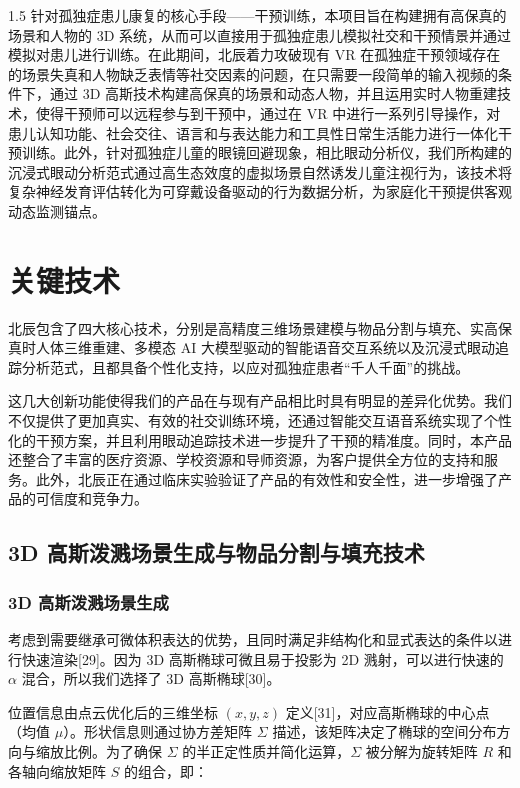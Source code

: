 \documentclass[zihao=-4]{ctexart}
\begin{document}
\begin{spacing}{1.5}
针对孤独症患儿康复的核心手段——干预训练，本项目旨在构建拥有高保真的场景和人物的 3D 系统，从而可以直接用于孤独症患儿模拟社交和干预情景并通过模拟对患儿进行训练。在此期间，北辰着力攻破现有 VR 在孤独症干预领域存在的场景失真和人物缺乏表情等社交因素的问题，在只需要一段简单的输入视频的条件下，通过 3D 高斯技术构建高保真的场景和动态人物，并且运用实时人物重建技术，使得干预师可以远程参与到干预中，通过在 VR 中进行一系列引导操作，对患儿认知功能、社会交往、语言和与表达能力和工具性日常生活能力进行一体化干预训练。此外，针对孤独症儿童的眼镜回避现象，相比眼动分析仪，我们所构建的沉浸式眼动分析范式通过高生态效度的虚拟场景自然诱发儿童注视行为，该技术将复杂神经发育评估转化为可穿戴设备驱动的行为数据分析，为家庭化干预提供客观动态监测锚点。

\section{关键技术}

北辰包含了四大核心技术，分别是高精度三维场景建模与物品分割与填充、实高保真时人体三维重建、多模态 AI 大模型驱动的智能语音交互系统以及沉浸式眼动追踪分析范式，且都具备个性化支持，以应对孤独症患者“千人千面”的挑战。

这几大创新功能使得我们的产品在与现有产品相比时具有明显的差异化优势。我们不仅提供了更加真实、有效的社交训练环境，还通过智能交互语音系统实现了个性化的干预方案，并且利用眼动追踪技术进一步提升了干预的精准度。同时，本产品还整合了丰富的医疗资源、学校资源和导师资源，为客户提供全方位的支持和服务。此外，北辰正在通过临床实验验证了产品的有效性和安全性，进一步增强了产品的可信度和竞争力。

\subsection{3D 高斯泼溅场景生成与物品分割与填充技术}

\subsubsection{3D 高斯泼溅场景生成}

考虑到需要继承可微体积表达的优势，且同时满足非结构化和显式表达的条件以进行快速渲染[29]。因为 3D 高斯椭球可微且易于投影为 2D 溅射，可以进行快速的 $\alpha$ 混合，所以我们选择了 3D 高斯椭球[30]。

位置信息由点云优化后的三维坐标 $(x,y,z)$ 定义[31]，对应高斯椭球的中心点（均值 $\mu$）。形状信息则通过协方差矩阵 $\Sigma$ 描述，该矩阵决定了椭球的空间分布方向与缩放比例。为了确保 $\Sigma$ 的半正定性质并简化运算，$\Sigma$ 被分解为旋转矩阵 $R$ 和各轴向缩放矩阵 $S$ 的组合，即：


\end{spacing}
\end{document}
